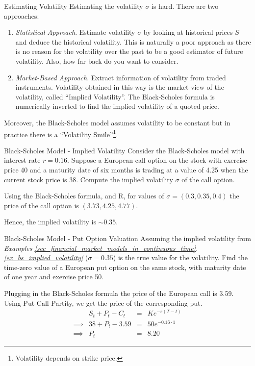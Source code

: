 \documentclass[11pt,a4paper]{article}
\begin{document}
  \begin{remark}{Estimating Volatility}
    Estimating the volatility $\sigma$ is hard. There are two approaches:
    \begin{enumerate}
      \item \textit{Statistical Approach}. Estimate volatility $\sigma$ by looking at historical prices $S$ and deduce the historical volatility. This is naturally a poor approach as there is no reason for the volatility over the past to be a good estimator of future volatility. Also, how far back do you want to consider.
      \item \textit{Market-Based Approach}. Extract information of volatility from traded instruments. Volatility obtained in this way is the market view of the volatility, called ``Implied Volatility''. The Black-Scholes formula is numerically inverted to find the implied volatility of a quoted price.
    \end{enumerate}
    Moreover, the Black-Scholes model assumes volatility to be constant but in practice there is a ``Volatility Smile''\footnote{Volatility depends on strike price.}.
  \end{remark}

  \begin{example}{Black-Scholes Model - Implied Volatility}\label{ex_bs_implied_volatility}
    Consider the Black-Scholes model with interest rate $r=0.16$. Suppose a European call option on the stock with exercise price 40 and a maturity date of six months is trading at a value of 4.25 when the current stock price is 38. Compute the implied volatility $\sigma$ of the call option.
    \par Using the Black-Scholes formula, and R, for values of $\sigma=(0.3,0.35,0.4)$ the price of the call option is $(3.73,4.25,4.77)$.
    \par Hence, the implied volatility is $\sim0.35$.
  \end{example}

  \begin{example}{Black-Scholes Model - Put Option Valuation}
    Assuming the implied volatility from \textit{Examples \ref{sec_financial_market_models_in_continuous_time}.\ref{ex_bs_implied_volatility}} ($\sigma=0.35$) is the true value for the volatility. Find the time-zero value of a European put option on the same stock, with maturity date of one year and exercise price 50.
    \par Plugging in the Black-Scholes formula the price of the European call is 3.59. Using Put-Call Partity, we get the price of the corresponding put.
    \[\begin{array}{rrcl}
      &S_t+P_t-C_t&=&Ke^{-r(T-t)}\\
      \implies&38+P_t-3.59&=&50e^{-0.16\cdot1}\\
      \implies&P_t&=&8.20
    \end{array}\]
  \end{example}
\end{document}
